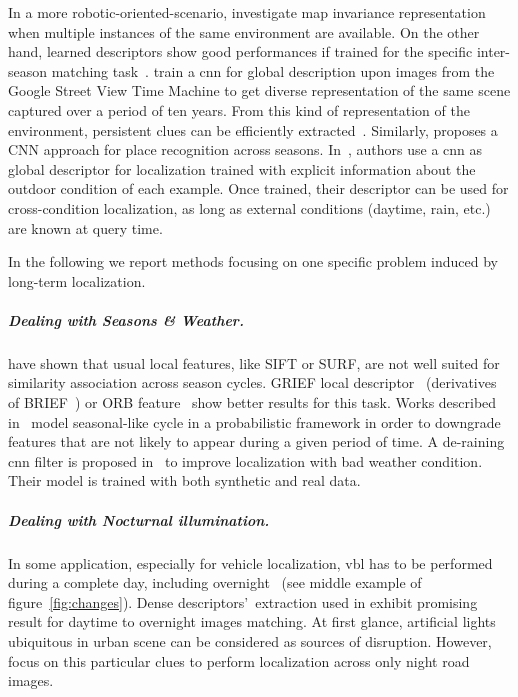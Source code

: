			In a more robotic-oriented-scenario, \citet{Muhlfellner2015} investigate map invariance representation when multiple instances of the same environment are available. On the other hand, learned descriptors show good performances if trained for the specific inter-season matching task~\citep{Carlevaris-Bianco2014}. \citet{Arandjelovic2017} train a \ac{cnn} for global description upon images from the Google Street View Time Machine to get diverse representation of the same scene captured over a period of ten years. From this kind of representation of the environment, persistent clues can be efficiently extracted~\citep{Neubert2015}. Similarly, \citet{kumar2017condition} proposes a CNN approach for place recognition across seasons. In~\citet{Germain2018}, authors use a \ac{cnn} as global descriptor for localization trained with explicit information about the outdoor condition of each example. Once trained, their descriptor can be used for cross-condition localization, as long as external conditions (\eg daytime, rain, etc.) are known at query time.
			
			In the following we report methods focusing on one specific problem induced by long-term localization. 

			\subparagraph{Dealing with Seasons \& Weather.}
				\citet{Valgren2010} have shown that usual local features, like SIFT or SURF, are not well suited for similarity association across season cycles. GRIEF local descriptor~\citep{Krajnik2017a} (derivatives of BRIEF~\citep{Calonder2010}) or ORB feature~\citep{Griffith2017} show better results for this task. Works described in~\citep{Krajnik2014,Krajnik2017a} model seasonal-like cycle in a probabilistic framework in order to downgrade features that are not likely to appear during a given period of time. A de-raining \ac{cnn} filter is proposed in~\citep{Porav2019} to improve localization with bad weather condition. Their model is trained with both synthetic and real data.
		
			\subparagraph{Dealing with Nocturnal illumination.}
				In some application, especially for vehicle localization, \ac{vbl} has to be performed during a complete day, including overnight~\citep{McManus2014,Milford2015} (see middle example of figure~\ref{fig:changes}). Dense descriptors'~extraction used in \citep{Torii2015} exhibit promising result for daytime to overnight images matching. At first glance, artificial lights ubiquitous in urban scene can be considered as sources of disruption. However, \citet{Nelson2015} focus on this particular clues to perform localization across only night road images. 
				
